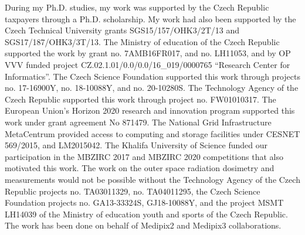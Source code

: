 During my Ph.D. studies, my work was supported by the Czech Republic taxpayers through a Ph.D. scholarship.
My work had also been supported by the Czech Technical University grants SGS15/157/OHK3/2T/13 and SGS17/187/OHK3/3T/13.
The Ministry of education of the Czech Republic supported the work by grant no. 7AMB16FR017, and no. LH11053, and by OP VVV funded project CZ.02.1.01/0.0/0.0/16\_019/0000765 ``Research Center for Informatics''.
The Czech Science Foundation supported this work through projects no. 17-16900Y, no. 18-10088Y, and no. 20-10280S.
The Technology Agency of the Czech Republic supported this work through project no. FW01010317.
The European Union's Horizon 2020 research and innovation program supported this work under grant agreement No 871479.
The National Grid Infrastructure MetaCentrum provided access to computing and storage facilities under CESNET 569/2015, and LM2015042.
The Khalifa University of Science funded our participation in the MBZIRC 2017 and MBZIRC 2020 competitions that also motivated this work.
The work on the outer space radiation dosimetry and measurements would not be possible without the Technology Agency of the Czech Republic projects no. TA03011329, no. TA04011295, the Czech Science Foundation projects no. GA13-33324S, GJ18-10088Y, and the project MSMT LH14039 of the Ministry of education youth and sports of the Czech Republic.
The work has been done on behalf of Medipix2 and Medipix3 collaborations.

\vspace{2.5cm}
